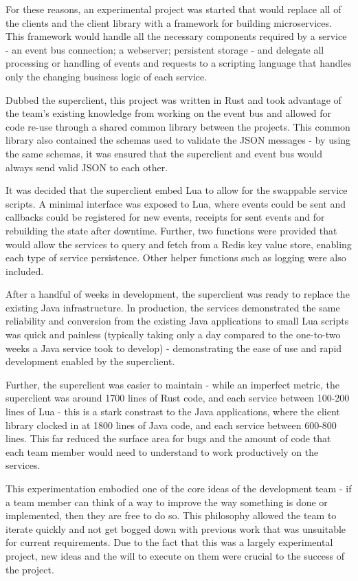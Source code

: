 \documentclass{l3proj}
\begin{document}
For these reasons, an experimental project was started that would replace all of the clients and the client library with a framework for building microservices. This framework would handle all the necessary components required by a service - an event bus connection; a webserver; persistent storage - and delegate all processing or handling of events and requests to a scripting language that handles only the changing business logic of each service.

Dubbed the superclient, this project was written in Rust and took advantage of the team's existing knowledge from working on the event bus and allowed for code re-use through a shared common library between the projects. This common library also contained the schemas used to validate the JSON messages - by using the same schemas, it was ensured that the superclient and event bus would always send valid JSON to each other.

It was decided that the superclient embed Lua to allow for the swappable service scripts. A minimal interface was exposed to Lua, where events could be sent and callbacks could be registered for new events, receipts for sent events and for rebuilding the state after downtime. Further, two functions were provided that would allow the services to query and fetch from a Redis key value store, enabling each type of service persistence. Other helper functions such as logging were also included.

After a handful of weeks in development, the superclient was ready to replace the existing Java infrastructure. In production, the services demonstrated the same reliability and conversion from the existing Java applications to small Lua scripts was quick and painless (typically taking only a day compared to the one-to-two weeks a Java service took to develop) - demonstrating the ease of use and rapid development enabled by the superclient.

Further, the superclient was easier to maintain - while an imperfect metric, the superclient was around 1700 lines of Rust code, and each service between 100-200 lines of Lua - this is a stark constrast to the Java applications, where the client library clocked in at 1800 lines of Java code, and each service between 600-800 lines. This far reduced the surface area for bugs and the amount of code that each team member would need to understand to work productively on the services.

This experimentation embodied one of the core ideas of the development team - if a team member can think of a way to improve the way something is done or implemented, then they are free to do so. This philosophy allowed the team to iterate quickly and not get bogged down with previous work that was unsuitable for current requirements. Due to the fact that this was a largely experimental project, new ideas and the will to execute on them were crucial to the success of the project.
\end{document}
